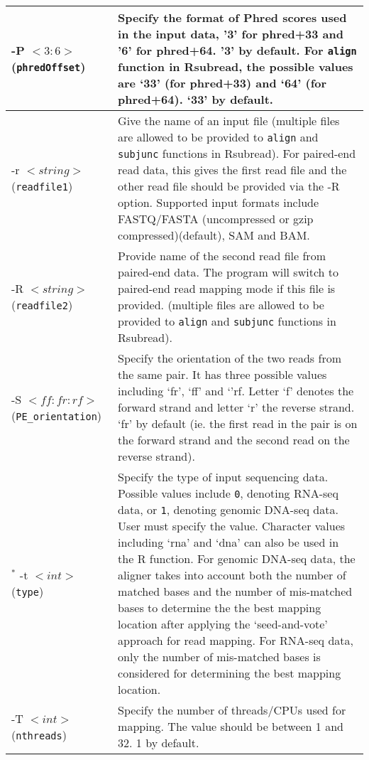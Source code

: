 \documentclass[12pt]{report}
\newcommand{\code}[1]{{\small\texttt{#1}}}
\newcommand{\Rsubread}{\textsf{Rsubread}}
\newcommand{\R}{\textsf{R}}
\begin{document}
\begin{longtable}{|p{4cm}|p{12cm}|}
\hline
-P $<3:6>$ \newline (\code{phredOffset}) & Specify the format of Phred scores used in the input data, '3' for phred+33 and '6' for phred+64. '3' by default. For \code{align} function in \Rsubread, the possible values are `33' (for phred+33) and `64' (for phred+64). `33' by default.\\
\hline
-r $<string>$ \newline (\code{readfile1}) & Give the name of an input file (multiple files are allowed to be provided to \code{align} and \code{subjunc} functions in {\Rsubread}). For paired-end read data, this gives the first read file and the other read file should be provided via the -R option. Supported input formats include FASTQ/FASTA (uncompressed or gzip compressed)(default), SAM and BAM.\\
\hline
-R $<string>$ \newline (\code{readfile2}) & Provide name of the second read file from paired-end data. The program will switch to paired-end read mapping mode if this file is provided. (multiple files are allowed to be provided to \code{align} and \code{subjunc} functions in {\Rsubread}).\\
\hline
-S $<ff:fr:rf>$ \newline (\code{PE\_orientation}) & Specify the orientation of the two reads from the same pair. It has three possible values including `fr', `ff' and `'rf. Letter `f' denotes the forward strand and letter `r' the reverse strand. `fr' by default (ie. the first read in the pair is on the forward strand and the second read on the reverse strand).\\
\hline
$^*$ -t $<int>$ \newline (\code{type}) & Specify the type of input sequencing data. Possible values include \code{0}, denoting RNA-seq data, or \code{1}, denoting genomic DNA-seq data. User must specify the value. Character values including `rna' and `dna' can also be used in the {\R} function.  For genomic DNA-seq data, the aligner takes into account both the number of matched bases and the number of mis-matched bases to determine the the best mapping location after applying the `seed-and-vote' approach for read mapping. For RNA-seq data, only the number of mis-matched bases is considered for determining the best mapping location. \\
\hline
-T $<int>$ \newline (\code{nthreads}) & Specify the number of threads/CPUs used for mapping. The value should be between 1 and 32. 1 by default.\\

\end{longtable}
\end{document}
